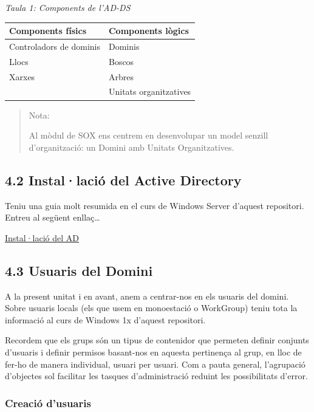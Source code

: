\documentclass[
  a4paper,
]{article}
\begin{document}
\emph{Taula 1: Components de l'AD-DS}

\begin{longtable}[]{@{}ll@{}}
\toprule\noalign{}
Components físics & Components lògics \\
\midrule\noalign{}
\endhead
\bottomrule\noalign{}
\endlastfoot
Controladors de dominis & Dominis \\
Llocs & Boscos \\
Xarxes & Arbres \\
& Unitats organitzatives \\
\end{longtable}

\begin{quote}
Nota:

Al mòdul de SOX ens centrem en desenvolupar un model senzill
d'organització: un Domini amb Unitats Organitzatives.
\end{quote}

\subsection{4.2 Instal·lació del Active
Directory}\label{installaciuxf3-del-active-directory}

Teniu una guia molt resumida en el curs de Windows Server d'aquest
repositori. Entreu al següent enllaç\ldots{}

\href{https://github.com/tofermos/Windows-Server/blob/main/md/ADDSenWindowsServerGUI.md}{Instal·lació
del AD}

\subsection{4.3 Usuaris del Domini}\label{usuaris-del-domini}

A la present unitat i en avant, anem a centrar-nos en els usuaris del
domini. Sobre usuaris locals (els que usem en monoestació o WorkGroup)
teniu tota la informació al curs de Windows 1x d'aquest repositori.

Recordem que els grups són un tipus de contenidor que permeten definir
conjunts d'usuaris i definir permisos basant-nos en aquesta pertinença
al grup, en lloc de fer-ho de manera individual, usuari per usuari. Com
a pauta general, l'agrupació d'objectes sol facilitar les tasques
d'administració reduint les possibilitats d'error.

\subsubsection{Creació d'usuaris}\label{creaciuxf3-dusuaris}
\end{document}
